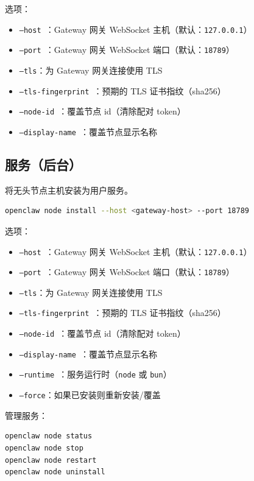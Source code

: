 选项：

\begin{itemize}
  \item \texttt{--host }：Gateway 网关 WebSocket 主机（默认：\texttt{127.0.0.1}）
  \item \texttt{--port }：Gateway 网关 WebSocket 端口（默认：\texttt{18789}）
  \item \texttt{--tls}：为 Gateway 网关连接使用 TLS
  \item \texttt{--tls-fingerprint }：预期的 TLS 证书指纹（sha256）
  \item \texttt{--node-id }：覆盖节点 id（清除配对 token）
  \item \texttt{--display-name }：覆盖节点显示名称
\end{itemize}


\subsection{服务（后台）}


将无头节点主机安装为用户服务。

\begin{lstlisting}[language=bash]
openclaw node install --host <gateway-host> --port 18789
\end{lstlisting}


选项：

\begin{itemize}
  \item \texttt{--host }：Gateway 网关 WebSocket 主机（默认：\texttt{127.0.0.1}）
  \item \texttt{--port }：Gateway 网关 WebSocket 端口（默认：\texttt{18789}）
  \item \texttt{--tls}：为 Gateway 网关连接使用 TLS
  \item \texttt{--tls-fingerprint }：预期的 TLS 证书指纹（sha256）
  \item \texttt{--node-id }：覆盖节点 id（清除配对 token）
  \item \texttt{--display-name }：覆盖节点显示名称
  \item \texttt{--runtime }：服务运行时（\texttt{node} 或 \texttt{bun}）
  \item \texttt{--force}：如果已安装则重新安装/覆盖
\end{itemize}


管理服务：

\begin{lstlisting}[language=bash]
openclaw node status
openclaw node stop
openclaw node restart
openclaw node uninstall
\end{lstlisting}


